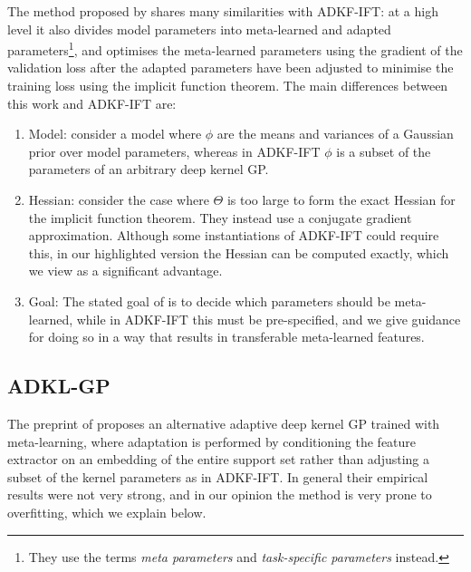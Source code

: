     The method proposed by \citet{chen2020modular} shares many similarities
    with ADKF-IFT:
    at a high level it also divides model parameters
    into meta-learned and adapted parameters\footnote{
    They use the terms \emph{meta parameters} and \emph{task-specific parameters} instead.},
    and optimises the meta-learned parameters using the gradient of the validation
    loss after the adapted parameters have been adjusted to minimise the training loss
    using the implicit function theorem.
    The main differences between this work and ADKF-IFT are:
    \begin{enumerate}
        \item Model: \citet{chen2020modular} consider a model where $\phi$ are the means and variances of a Gaussian prior over model parameters,
        whereas in ADKF-IFT $\phi$ is a subset of the parameters of an arbitrary deep kernel GP.
        \item Hessian: \citet{chen2020modular} consider the case where $\Theta$ is too large to form the exact Hessian for the implicit function theorem. They instead use a conjugate gradient approximation.
        Although some instantiations of ADKF-IFT could require this,
        in our highlighted version the Hessian can be computed exactly,
        which we view as a significant advantage.
        \item Goal: The stated goal of \citet{chen2020modular} is to decide which parameters should be meta-learned,
        while in ADKF-IFT this must be pre-specified,
        and we give guidance for doing so in a way that results in transferable
        meta-learned features.
    \end{enumerate}

    \subsection{ADKL-GP \citep{tossou2019adaptive}}\label{ssec:adkl-explanation}
    
    The preprint of \citet{tossou2019adaptive} proposes an alternative adaptive deep kernel GP trained with meta-learning,
    where adaptation is performed by conditioning the feature extractor on an embedding of the entire support set
    rather than adjusting a subset of the kernel parameters as in ADKF-IFT.
    In general their empirical results were not very strong,
    and in our opinion the method is very prone to overfitting, which we explain below.
    
